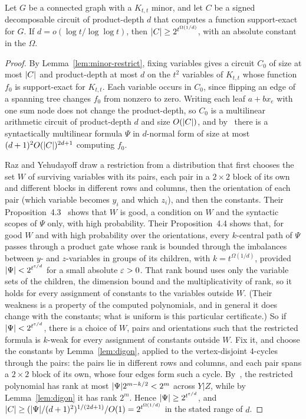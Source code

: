 \begin{theorem}\label{thm:signed-depth}
Let $G$ be a connected graph with a $K_{t,t}$ minor, and let $C$ be a signed decomposable circuit of product-depth $d$ that computes a function support-exact for $G$. If $d=o(\log t/\log\log t)$, then $\lvert C\rvert\ge2^{t^{\Omega(1/d)}}$, with an absolute constant in the $\Omega$.
\end{theorem}

\begin{proof}
By Lemma~\ref{lem:minor-restrict}, fixing variables gives a circuit $C_0$ of size at most $\lvert C\rvert$ and product-depth at most $d$ on the $t^2$ variables of $K_{t,t}$ whose function $f_0$ is support-exact for $K_{t,t}$. Each variable occurs in $C_0$, since flipping an edge of a spanning tree changes $f_0$ from nonzero to zero. Writing each leaf $a+bx_e$ with one sum node does not change the product-depth, so $C_0$ is a multilinear arithmetic circuit of product-depth $d$ and size $O(\lvert C\rvert)$, and by~\cite[Lemma~2.1]{RazYehudayoff09} there is a syntactically multilinear formula $\Psi$ in $d$-normal form of size at most $(d+1)^2O(\lvert C\rvert)^{2d+1}$ computing $f_0$.

Raz and Yehudayoff draw a restriction from a distribution that first chooses the set $W$ of surviving variables with its pairs, each pair in a $2\times2$ block of its own and different blocks in different rows and columns, then the orientation of each pair (which variable becomes $y_i$ and which $z_i$), and then the constants. Their Proposition~4.3~\cite{RazYehudayoff09} shows that $W$ is good, a condition on $W$ and the syntactic scopes of $\Psi$ only, with high probability. Their Proposition~4.4 shows that, for good $W$ and with high probability over the orientations, every $k$-central path of $\Psi$ passes through a product gate whose rank is bounded through the imbalances between $y$- and $z$-variables in groups of its children, with $k=t^{\Omega(1/d)}$, provided $\lvert \Psi\rvert<2^{t^{\varepsilon/d}}$ for a small absolute $\varepsilon>0$. That rank bound uses only the variable sets of the children, the dimension bound and the multiplicativity of rank, so it holds for every assignment of constants to the variables outside $W$. (Their weakness is a property of the computed polynomials, and in general it does change with the constants; what is uniform is this particular certificate.) So if $\lvert \Psi\rvert<2^{t^{\varepsilon/d}}$, there is a choice of $W$, pairs and orientations such that the restricted formula is $k$-weak for every assignment of constants outside $W$. Fix it, and choose the constants by Lemma~\ref{lem:digon}, applied to the vertex-disjoint $4$-cycles through the pairs: the pairs lie in different rows and columns, and each pair spans a $2\times2$ block of its own, whose four edges form such a cycle. By~\cite[Theorem~3.1]{RazYehudayoff09}, the restricted polynomial has rank at most $\lvert \Psi\rvert2^{m-k/2}<2^m$ across $Y|Z$, while by Lemma~\ref{lem:digon} it has rank $2^m$. Hence $\lvert \Psi\rvert\ge2^{t^{\varepsilon/d}}$, and $\lvert C\rvert\ge(\lvert \Psi\rvert/(d+1)^2)^{1/(2d+1)}/O(1)=2^{t^{\Omega(1/d)}}$ in the stated range of $d$.
\end{proof}


